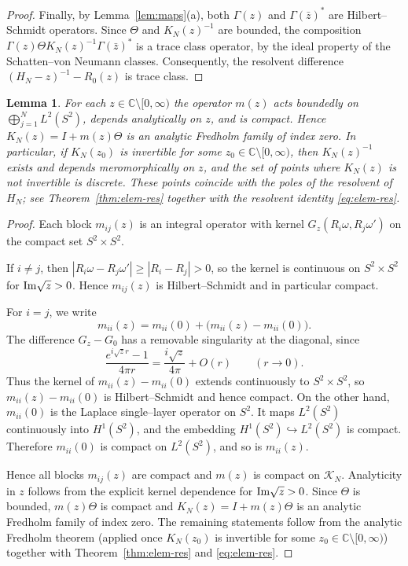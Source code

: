 \documentclass[a4paper,11pt]{article}
\numberwithin{equation}{section}
\def\co{\mathbb{C}}
\renewcommand{\Im}{\text{{\rm Im}}}
\newtheorem{lem}[thm]{Lemma}
\theoremstyle{definition}
\theoremstyle{remark}
\begin{document}
\begin{proof}
Finally, by Lemma~\ref{lem:maps}(a), both $\Gamma(z)$ and $\Gamma(\bar z)^{\ast}$ are
Hilbert--Schmidt operators.
Since $\Theta$ and $K_N(z)^{-1}$ are bounded, the composition
$\Gamma(z)\Theta K_N(z)^{-1}\Gamma(\bar z)^{\ast}$ is a trace class operator,
by the ideal property of the Schatten--von Neumann classes.
Consequently, the resolvent difference $(H_N-z)^{-1}-R_0(z)$ is trace class.
\end{proof}

\begin{lem}\label{lem:compact-m}
For each $z\in\co\setminus[0,\infty)$ the operator $m(z)$ acts boundedly on
$\bigoplus_{j=1}^N L^2(S^2)$, depends analytically on $z$, and is compact.
Hence $K_N(z)=I+m(z)\Theta$ is an analytic Fredholm family of index zero.
In particular, if $K_N(z_0)$ is invertible for some $z_0\in\co\setminus[0,\infty)$,
then $K_N(z)^{-1}$ exists and depends meromorphically on $z$, and the
set of points where $K_N(z)$ is not invertible is discrete.
These points coincide with the poles of the resolvent of $H_N$; see
Theorem~\ref{thm:elem-res} together with the resolvent identity
\eqref{eq:elem-res}.
\end{lem}

\begin{proof}
Each block $m_{ij}(z)$ is an integral operator with kernel
$G_z(R_i\omega,R_j\omega')$ on the compact set $S^2\times S^2$.

If $i\ne j$, then $|R_i\omega-R_j\omega'|\ge|R_i-R_j|>0$, so the kernel is continuous
on $S^2\times S^2$ for $\Im\sqrt z>0$.
Hence $m_{ij}(z)$ is Hilbert--Schmidt and in particular compact.

For $i=j$, we write
$$
m_{ii}(z)=m_{ii}(0)+\bigl(m_{ii}(z)-m_{ii}(0)\bigr).
$$
The difference $G_z-G_0$ has a removable singularity at the diagonal, since
$$
\frac{e^{i\sqrt z r}-1}{4\pi r}
=
\frac{i\sqrt z}{4\pi}+O(r)
\qquad(r\to0).
$$
Thus the kernel of $m_{ii}(z)-m_{ii}(0)$ extends continuously to $S^2\times S^2$,
so $m_{ii}(z)-m_{ii}(0)$ is Hilbert--Schmidt and hence compact.
On the other hand, $m_{ii}(0)$ is the Laplace single--layer operator on $S^2$.
It maps $L^2(S^2)$ continuously into $H^1(S^2)$, and the embedding
$H^1(S^2)\hookrightarrow L^2(S^2)$ is compact.
Therefore $m_{ii}(0)$ is compact on $L^2(S^2)$, and so is $m_{ii}(z)$.

Hence all blocks $m_{ij}(z)$ are compact and $m(z)$ is compact on
$\mathcal K_N$.
Analyticity in $z$ follows from the explicit kernel dependence for $\Im\sqrt z>0$.
Since $\Theta$ is bounded, $m(z)\Theta$ is compact and $K_N(z)=I+m(z)\Theta$ is an
analytic Fredholm family of index zero.
The remaining statements follow from the analytic Fredholm theorem (applied once
$K_N(z_0)$ is invertible for some $z_0\in\co\setminus[0,\infty)$) together with
Theorem~\ref{thm:elem-res} and \eqref{eq:elem-res}.
\end{proof}
\end{document}

